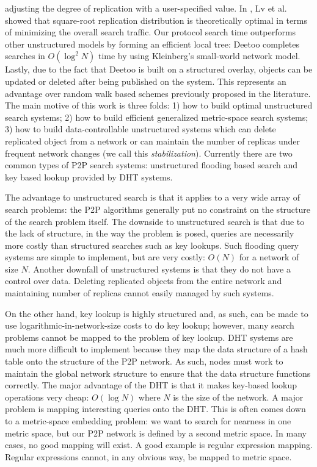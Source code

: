 \documentclass[conference]{IEEEtran}
\begin{document}
adjusting the degree of replication with a user-specified value.
In \cite{LCKS02}, Lv et al. showed that
square-root replication distribution is theoretically optimal in
terms of minimizing the overall search traffic. 
Our protocol search time outperforms other unstructured models by forming 
an efficient local tree: 
Deetoo completes searches in  
$O(\log^2{N})$ time by using Kleinberg's small-world network model.  
Lastly, due to the fact that Deetoo is built on a structured overlay,
objects can be updated or deleted after being published on the
system.  This represents an advantage over random
walk based schemes previously proposed in the literature.
The main motive of this work is three folds: 1) how to build optimal unstructured 
search systems; 2) how to build efficient generalized metric-space search systems;
3) how to build data-controllable unstructured systems which can delete replicated
object from a network or can maintain the number of replicas under frequent network 
changes (we call this \textit{stabilization}).
Currently there are two common types of P2P search systems: 
unstructured flooding based search and key based lookup provided by DHT systems.

The advantage to unstructured search is that it applies to a very wide array of 
search problems: the P2P algorithms generally put no constraint on 
the structure of the search problem itself. The downside to unstructured search is 
that due to the lack of structure, in the way the problem is posed, queries are 
necessarily more costly than structured searches such as key lookups.
Such flooding query systems are simple to implement, but
are very costly: $O(N)$ for a network of size $N$.
Another downfall of unstructured systems is that they do not have a control over 
data. Deleting replicated objects from the entire network and maintaining
number of replicas cannot easily managed by such systems.



On the other hand, key lookup is highly structured and, as such, can be made to use 
logarithmic-in-network-size costs to do key lookup; however, 
many search problems cannot be mapped to the problem of key lookup.
DHT systems are much more difficult
to implement because they map the data structure of a hash table onto the structure of the P2P network. 
As such, nodes must work to maintain the global network structure to ensure that 
the data structure functions correctly.
The major advantage of the DHT is that it makes key-based lookup operations 
very cheap: $O(\log{N})$ where $N$ is the size of the network.
A major problem is mapping interesting queries onto the DHT. This is often comes down to a metric-space
embedding problem: we want to search for nearness in one metric space, but our
P2P network is defined by a second metric space. 
In many cases, no good mapping will exist. A good example is regular expression mapping. 
Regular expressions cannot, in any obvious way, be mapped to metric space.
\end{document}
